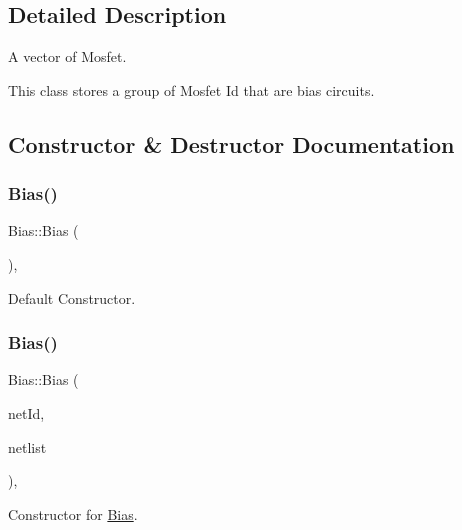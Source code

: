 \subsection{Detailed Description}
A vector of Mosfet. 

This class stores a group of Mosfet Id that are bias circuits. 

\subsection{Constructor \& Destructor Documentation}
\mbox{\label{classBias_a5e0a80d4549e61f0e5d8c9d00659ad4d}} 
\subsubsection{\texorpdfstring{Bias()}{Bias()}\hspace{0.1cm}{\footnotesize\ttfamily [1/2]}}
{\footnotesize\ttfamily Bias\+::\+Bias (\begin{DoxyParamCaption}{ }\end{DoxyParamCaption})\hspace{0.3cm}{\ttfamily [explicit]}, {\ttfamily [default]}}



Default Constructor. 

\mbox{\label{classBias_a1373ea9210307ff6e856d705ca24cd1d}} 
\subsubsection{\texorpdfstring{Bias()}{Bias()}\hspace{0.1cm}{\footnotesize\ttfamily [2/2]}}
{\footnotesize\ttfamily Bias\+::\+Bias (\begin{DoxyParamCaption}\item[{\hyperlink{type_8h_a581e8093e28e7362f2b6937296190676}{Index\+Type}}]{net\+Id,  }\item[{const \hyperlink{classNetlist}{Netlist} \&}]{netlist }\end{DoxyParamCaption})\hspace{0.3cm}{\ttfamily [inline]}, {\ttfamily [explicit]}}



Constructor for \hyperlink{classBias}{Bias}. 

